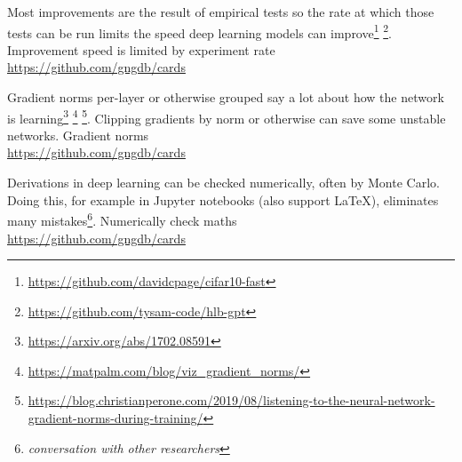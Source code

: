 \documentclass[grid,avery5371]{flashcards}
\newcommand{\cb}[1]{#1 \\ {\small \url{https://github.com/gngdb/cards}}}
\begin{document}
\begin{flashcard}[???]{%
Most improvements are the result of empirical tests so the rate at which
those tests can be run limits the speed deep learning models can 
improve\footnote{\small \url{https://github.com/davidcpage/cifar10-fast}} \footnote{\small \url{https://github.com/tysam-code/hlb-gpt}}.
}
\cb{Improvement speed is limited by experiment rate}
\end{flashcard}

\begin{flashcard}[???]{%
Gradient norms per-layer or otherwise grouped say
a lot about how the network is 
learning\footnote{\small \url{https://arxiv.org/abs/1702.08591}}
\footnote{\small \url{https://matpalm.com/blog/viz_gradient_norms/}}
\footnote{\small \sloppy \url{https://blog.christianperone.com/2019/08/listening-to-the-neural-network-gradient-norms-during-training/}}.
Clipping gradients by norm or otherwise can save some
unstable networks.
}
\cb{Gradient norms}
\end{flashcard}

\begin{flashcard}[???]{%
Derivations in deep learning can be checked numerically, often
by Monte Carlo. Doing this, for example in Jupyter notebooks (also support LaTeX),
eliminates many mistakes\footnote{\small \emph{conversation with other researchers}}.
}
\cb{Numerically check maths}
\end{flashcard}


\end{document}

